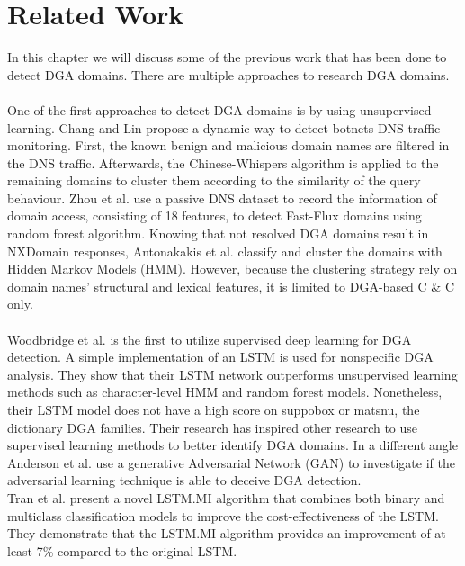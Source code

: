 \chapter{Related Work}\label{relatedwork}
In this chapter we will discuss some of the previous work that has been done to detect DGA domains. There are multiple approaches to research DGA domains.\\\\
One of the first approaches to detect DGA domains is by using unsupervised learning. Chang and Lin \cite{Chang_Lin} propose a dynamic way to detect botnets DNS traffic monitoring. First, the known benign and malicious domain names are filtered in the DNS traffic.  Afterwards, the Chinese-Whispers algorithm is applied to the remaining domains to cluster them according to the similarity of the query behaviour. 
Zhou et al. \cite{Zhou2013DGABasedBD} use a passive DNS dataset to record the information of domain access, consisting of 18 features, to detect Fast-Flux domains using random forest algorithm. 
Knowing that not resolved DGA domains result in NXDomain responses, Antonakakis et al. \cite{Antonakakis} classify and cluster the domains with Hidden Markov Models (HMM). However, because the clustering strategy rely on domain names' structural and lexical features, it is limited to DGA-based C \& C only.\\\\ 
Woodbridge et al. \cite{Woodbridge} is the first to utilize supervised deep learning for DGA detection. A simple implementation of an LSTM is used for nonspecific DGA analysis. They show that their LSTM network outperforms unsupervised learning methods such as character-level HMM and random forest models. Nonetheless, their LSTM model does not have a high score on suppobox or matsnu, the dictionary DGA families. Their research has inspired other research to use supervised learning methods to better identify DGA domains. 
In a different angle Anderson et al. \cite{Anderson} use a generative Adversarial Network (GAN) to investigate if the adversarial learning technique is able to deceive DGA detection.
\pagebreak
\\Tran et al. \cite{TRAN20182401} present a novel LSTM.MI algorithm that combines both binary and multiclass classification models to improve the cost-effectiveness of the LSTM. They demonstrate that the LSTM.MI algorithm provides an improvement of at least 7\% compared to the original LSTM.
